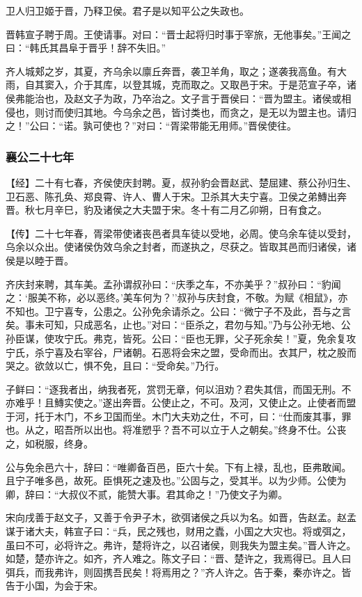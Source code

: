 \documentclass[]{article}
\begin{document}
卫人归卫姬于晋，乃释卫侯。君子是以知平公之失政也。

晋韩宣子聘于周。王使请事。对曰：``晋士起将归时事于宰旅，无他事矣。''王闻之曰：``韩氏其昌阜于晋乎！辞不失旧。''

齐人城郏之岁，其夏，齐乌余以廪丘奔晋，袭卫羊角，取之；遂袭我高鱼。有大雨，自其窦入，介于其库，以登其城，克而取之。又取邑于宋。于是范宣子卒，诸侯弗能治也，及赵文子为政，乃卒治之。文子言于晋侯曰：``晋为盟主。诸侯或相侵也，则讨而使归其地。今乌余之邑，皆讨类也，而贪之，是无以为盟主也。请归之！''公曰：``诺。孰可使也？''对曰：``胥梁带能无用师。''晋侯使往。

\hypertarget{header-n2228}{%
\subsubsection{襄公二十七年}\label{header-n2228}}

【经】二十有七春，齐侯使庆封聘。夏，叔孙豹会晋赵武、楚屈建、蔡公孙归生、卫石恶、陈孔奂、郑良霄、许人、曹人于宋。卫杀其大夫宁喜。卫侯之弟鱄出奔晋。秋七月辛巳，豹及诸侯之大夫盟于宋。冬十有二月乙卯朔，日有食之。

【传】二十七年春，胥梁带使诸丧邑者具车徒以受地，必周。使乌余车徒以受封，乌余以众出。使诸侯伪效乌余之封者，而遂执之，尽获之。皆取其邑而归诸侯，诸侯是以睦于晋。

齐庆封来聘，其车美。孟孙谓叔孙曰：``庆季之车，不亦美乎？''叔孙曰：``豹闻之：`服美不称，必以恶终。'美车何为？''叔孙与庆封食，不敬。为赋《相鼠》，亦不知也。卫宁喜专，公患之。公孙免余请杀之。公曰：``微宁子不及此，吾与之言矣。事未可知，只成恶名，止也。''对曰：``臣杀之，君勿与知。''乃与公孙无地、公孙臣谋，使攻宁氏。弗克，皆死。公曰：``臣也无罪，父子死余矣！''夏，免余复攻宁氏，杀宁喜及右宰谷，尸诸朝。石恶将会宋之盟，受命而出。衣其尸，枕之股而哭之。欲敛以亡，惧不免，且曰：``受命矣。''乃行。

子鲜曰：``逐我者出，纳我者死，赏罚无章，何以沮劝？君失其信，而国无刑。不亦难乎！且鱄实使之。''遂出奔晋。公使止之，不可。及河，又使止之。止使者而盟于河，托于木门，不乡卫国而坐。木门大夫劝之仕，不可，曰：``仕而废其事，罪也。从之，昭吾所以出也。将准愬乎？吾不可以立于人之朝矣。''终身不仕。公丧之，如税服，终身。

公与免余邑六十，辞曰：``唯卿备百邑，臣六十矣。下有上禄，乱也，臣弗敢闻。且宁子唯多邑，故死。臣惧死之速及也。''公固与之，受其半。以为少师。公使为卿，辞曰：``大叔仪不贰，能赞大事。君其命之！''乃使文子为卿。

宋向戌善于赵文子，又善于令尹子木，欲弭诸侯之兵以为名。如晋，告赵孟。赵孟谋于诸大夫，韩宣子曰：``兵，民之残也，财用之蠹，小国之大灾也。将或弭之，虽曰不可，必将许之。弗许，楚将许之，以召诸侯，则我失为盟主矣。''晋人许之。如楚，楚亦许之。如齐，齐人难之。陈文子曰：``晋、楚许之，我焉得已。且人曰弭兵，而我弗许，则固携吾民矣！将焉用之？''齐人许之。告于秦，秦亦许之。皆告于小国，为会于宋。
\end{document}
